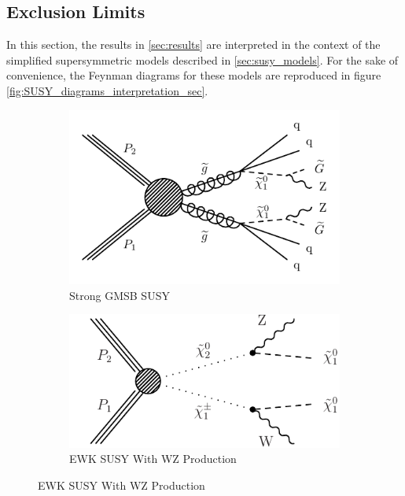   \subsection{Exclusion Limits} \label{sec:exclusion_limits}

    In this section, the results in \ref{sec:results} are interpreted in the context of the simplified supersymmetric models described in \ref{sec:susy_models}. For the sake of convenience, the Feynman diagrams for these models are reproduced in figure \ref{fig:SUSY_diagrams_interpretation_sec}.

    \begin{figure}[!h]
      \centering
      \begin{subfigure}[b]{0.49\textwidth}
        \includegraphics[width=\textwidth]{figures/diagrams/T5ZZ.pdf} 
        \caption{Strong GMSB SUSY}
        \label{fig:t5zz_diagram_interpretations}
      \end{subfigure}
      \begin{subfigure}[b]{0.49\textwidth}
        \includegraphics[width=\textwidth]{figures/diagrams/TChiWZ.pdf}
        \caption{EWK SUSY With WZ Production}

\end{subfigure}
\end{figure}
